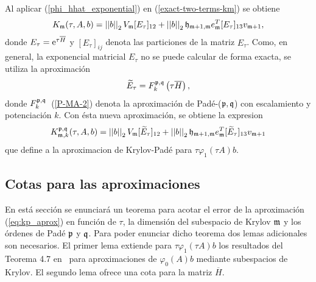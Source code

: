 Al aplicar (\ref{phi_hhat_exponential}) en (\ref{exact-two-terms-km}) se obtiene
\begin{equation*}
    K_{\mathfrak{m}}(\tau,A,b) = \left\lvert \left\lvert  b  \right\rvert \right\rvert_2V_{\mathfrak{m}} [E_\tau]_{12} + \left\lvert \left\lvert  b  \right\rvert \right\rvert_2\mathfrak{h}_{\mathfrak{m}+1,\mathfrak{m}}e^T_{\mathfrak{m}}[E_\tau]_{13}v_{\mathfrak{m}+1}, 
 \end{equation*}
 donde $E_\tau = \mathrm{e}^{\tau \overline{H} }$ y $[E_\tau]_{ij}$ denota las particiones de la matriz $E_\tau$. Como, en general, la exponencial matricial $E_\tau$ no se puede calcular de forma exacta, se utiliza la aproximación
\begin{equation*}
    \widetilde{E}_{\tau} = F_k^{\mathfrak{p},\mathfrak{q}}\left(\tau\overline{H}\right),
\end{equation*}
donde $F_k^{\mathfrak{p},\mathfrak{q}}$~(\ref{P-MA-2}) denota la aproximación de Padé-($\mathfrak{p},\mathfrak{q}$) con escalamiento y potenciación $k$. Con ésta nueva aproximación, se obtiene la expresion 
\begin{equation} \label{eq:kp_aprox}
    K_{\mathfrak{m},k}^{\mathfrak{p},\mathfrak{q}}(\tau,A,b) = \left\lvert \left\lvert  b  \right\rvert \right\rvert_2V_{\mathfrak{m}} [\widetilde{E}_\tau]_{12} + \left\lvert \left\lvert  b  \right\rvert \right\rvert_2\mathfrak{h}_{\mathfrak{m}+1,\mathfrak{m}}e^T_{\mathfrak{m}}[\widetilde{E}_\tau]_{13}v_{\mathfrak{m}+1}
 \end{equation}
 que define a la aproximacion de Krylov-Padé para $\tau\varphi_1(\tau A)b$.

 \subsection{Cotas para las aproximaciones}
 En está sección se enunciará un teorema para acotar el error de la aproximación (\ref{eq:kp_aprox}) en función de $\tau$, la dimensión del subespacio de Krylov $\mathfrak{m}$ y los órdenes de Padé $\mathfrak{p}$ y $\mathfrak{q}$. Para poder enunciar dicho teorema dos lemas adicionales son necesarios. El primer lema extiende para $\tau \varphi_1(\tau A)b$ los resultados del Teorema 4.7 en~\cite{Saad92} para aproximaciones de $\varphi_0(A)b$ mediante subespacios de Krylov. El segundo lema ofrece una cota para la matriz $\overline{H}$.

